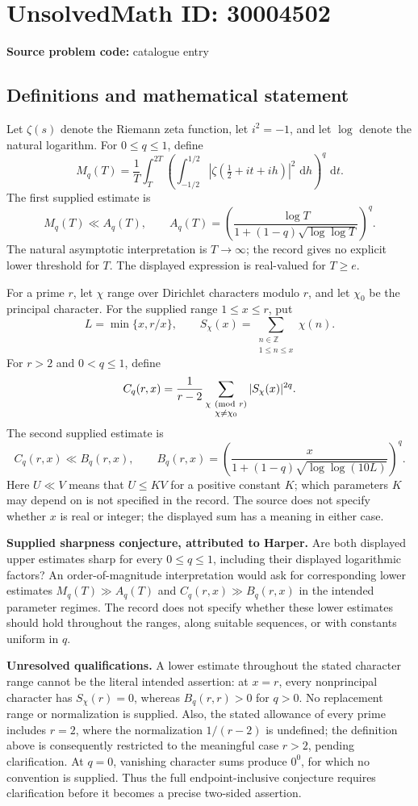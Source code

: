 \documentclass[11pt]{article}
\newcommand{\Z}{\mathbb{Z}}
\newcommand{\dd}{\,\mathrm{d}}
\begin{document}
\section*{UnsolvedMath ID: 30004502}
\textbf{Source problem code:} catalogue entry
\subsection{Definitions and mathematical statement}
Let \(\zeta(s)\) denote the Riemann zeta function, let \(i^2=-1\), and let \(\log\) denote the natural logarithm. For \(0\leq q\leq1\), define
\[
M_q(T)=\frac1T\int_T^{2T}\left(\int_{-1/2}^{1/2}\left|\zeta\!\left(\tfrac12+it+ih\right)\right|^2\,\dd h\right)^q\,\dd t.
\]
The first supplied estimate is
\[
M_q(T)\ll A_q(T),\qquad
A_q(T)=\left(\frac{\log T}{1+(1-q)\sqrt{\log\log T}}\right)^q.
\]
The natural asymptotic interpretation is \(T\to\infty\); the record gives no explicit lower threshold for \(T\). The displayed expression is real-valued for \(T\geq e\).

For a prime \(r\), let \(\chi\) range over Dirichlet characters modulo \(r\), and let \(\chi_0\) be the principal character. For the supplied range \(1\leq x\leq r\), put
\[
L=\min\{x,r/x\},\qquad S_\chi(x)=\sum_{\substack{n\in\Z\\1\leq n\leq x}}\chi(n).
\]
For \(r>2\) and \(0<q\leq1\), define
\[
C_q(r,x)=\frac1{r-2}\sum_{\substack{\chi\ ({\rm mod}\ r)\\\chi\ne\chi_0}}|S_\chi(x)|^{2q}.
\]
The second supplied estimate is
\[
C_q(r,x)\ll B_q(r,x),\qquad
B_q(r,x)=\left(\frac{x}{1+(1-q)\sqrt{\log\log(10L)}}\right)^q.
\]
Here \(U\ll V\) means that \(U\leq K V\) for a positive constant \(K\); which parameters \(K\) may depend on is not specified in the record. The source does not specify whether \(x\) is real or integer; the displayed sum has a meaning in either case.

\textbf{Supplied sharpness conjecture, attributed to Harper.} Are both displayed upper estimates sharp for every \(0\leq q\leq1\), including their displayed logarithmic factors? An order-of-magnitude interpretation would ask for corresponding lower estimates \(M_q(T)\gg A_q(T)\) and \(C_q(r,x)\gg B_q(r,x)\) in the intended parameter regimes. The record does not specify whether these lower estimates should hold throughout the ranges, along suitable sequences, or with constants uniform in \(q\).

\textbf{Unresolved qualifications.} A lower estimate throughout the stated character range cannot be the literal intended assertion: at \(x=r\), every nonprincipal character has \(S_\chi(r)=0\), whereas \(B_q(r,r)>0\) for \(q>0\). No replacement range or normalization is supplied. Also, the stated allowance of every prime includes \(r=2\), where the normalization \(1/(r-2)\) is undefined; the definition above is consequently restricted to the meaningful case \(r>2\), pending clarification. At \(q=0\), vanishing character sums produce \(0^0\), for which no convention is supplied. Thus the full endpoint-inclusive conjecture requires clarification before it becomes a precise two-sided assertion.
\end{document}
